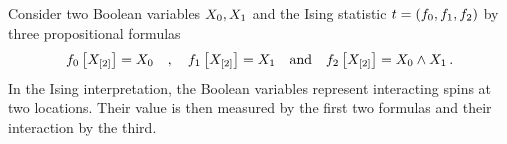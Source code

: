 \begin{example}
    Consider two Boolean variables $X_{0},X_{1}$ and the Ising statistic $t=(f_{0},f_{1},f_{2})$ by three propositional formulas
    \begin{align*}
        f_{0}\left[X_{[2]}\right] = X_{0} \quad , \quad
        f_{1}\left[X_{[2]}\right] = X_{1} \quad\text{and}\quad
        f_{2}\left[X_{[2]}\right] = X_{0}\land X_{1} \, .
    \end{align*}
    In the Ising interpretation, the Boolean variables represent interacting spins at two locations.
    Their value is then measured by the first two formulas and their interaction by the third.


\end{example}
